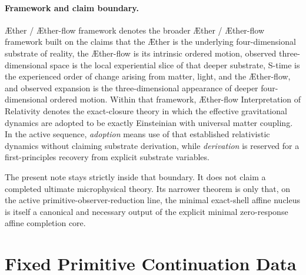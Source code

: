 \documentclass[11pt]{article}
\newcommand{\Aether}{\AE{}ther}
\newcommand{\Aflow}{\AE{}ther-flow}
\newcommand{\TheoryName}{\Aflow{} Interpretation of Relativity}
\newcommand{\TheoryProgram}{\Aether{} / \Aflow{} framework}
\begin{document}
\paragraph{Framework and claim boundary.}
\TheoryProgram{} denotes the broader \Aether{} / \Aflow{} framework built on the claims that the \Aether{} is the underlying four-dimensional substrate of reality, the \Aflow{} is its intrinsic ordered motion, observed three-dimensional space is the local experiential slice of that deeper substrate, S-time is the experienced order of change arising from matter, light, and the \Aflow{}, and observed expansion is the three-dimensional appearance of deeper four-dimensional ordered motion. Within that framework, \TheoryName{} denotes the exact-closure theory in which the effective gravitational dynamics are adopted to be exactly Einsteinian with universal matter coupling. In the active sequence, \emph{adoption} means use of that established relativistic dynamics without claiming substrate derivation, while \emph{derivation} is reserved for a first-principles recovery from explicit substrate variables.

The present note stays strictly inside that boundary. It does not claim a completed ultimate microphysical theory. Its narrower theorem is only that, on the active primitive-observer-reduction line, the minimal exact-shell affine nucleus is itself a canonical and necessary output of the explicit minimal zero-response affine completion core.

\section{Fixed Primitive Continuation Data}
\end{document}
